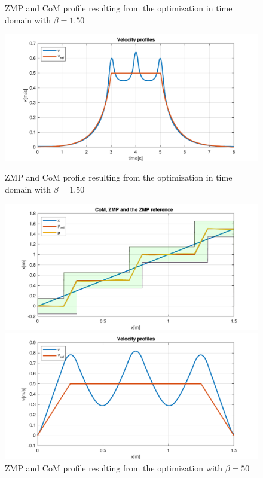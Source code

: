 \documentclass[a4paper]{article}
\begin{document}
\begin{figure}
\begin{minipage}[b]{0.48\textwidth}
        \caption{ZMP and CoM profile resulting from the optimization in time domain with $\beta=1.50$} 
        \label{fig:opt_x_150_time}
     \end{minipage}  
     \hfill
     \begin{minipage}[b]{0.48\textwidth}
         \centering
        \includegraphics[scale=0.4]{plot/SQD/150/vx_time_150.pdf} 
        \caption{ZMP and CoM profile resulting from the optimization in time domain with $\beta=1.50$} 
        \label{fig:opt_vx_150_time}
     \end{minipage}     
\begin{minipage}[b]{0.48\textwidth}
         \centering
         \includegraphics[scale=0.4]{plot/SQD/50/x_opt_50.pdf} 
         \caption{ZMP and CoM profile resulting from the optimization with $\beta=50$} 
         \label{fig:opt_x_50_space}
     \end{minipage}
     \hfill
     \begin{minipage}[b]{0.48\textwidth}
         \centering
        \includegraphics[scale=0.4]{plot/SQD/50/vx_opt_50.pdf} 

\end{minipage}
\end{figure}
\end{document}
